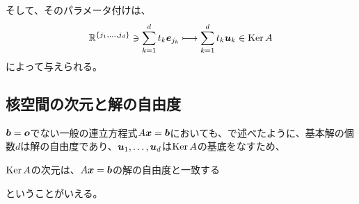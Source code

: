 \documentclass[../../../topic_linear-algebra]{subfiles}
\begin{document}
\br

そして、そのパラメータ付けは、
\begin{equation*}
  \mathbb{R}^{\{ j_1, \dots, j_d \}} \ni \sum_{k=1}^d t_k \vb*{e}_{j_k} \longmapsto \sum_{k=1}^d t_k \vb*{u}_k \in \operatorname{Ker} A
\end{equation*}
によって与えられる。

\subsection{核空間の次元と解の自由度}\label{sec:nullity-solution-degrees}

$\vb*{b} = \vb*{o}$でない一般の連立方程式$A\vb*{x} = \vb*{b}$においても、で述べたように、{基本解の個数$d$は解の自由度}であり、$\vb*{u}_1, \ldots, \vb*{u}_d$は$\operatorname{Ker} A$の基底をなすため、
\begin{emphabox}
  \begin{spacebox}
    \begin{center}
      $\operatorname{Ker} A$の次元は、$A\vb*{x} = \vb*{b}$の解の自由度と一致する
    \end{center}
  \end{spacebox}
\end{emphabox}
ということがいえる。
\end{document}

